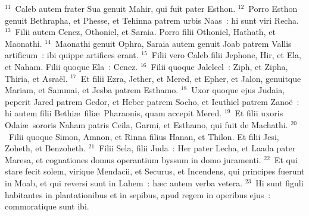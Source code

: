 ${}^{11}$~Caleb autem frater Sua genuit Mahir, qui fuit pater Esthon.
${}^{12}$~Porro Esthon genuit Bethrapha, et Phesse, et Tehinna patrem urbis Naas~: hi sunt viri Recha.
${}^{13}$~Filii autem Cenez, Othoniel, et Saraia. Porro filii Othoniel, Hathath, et Maonathi.
${}^{14}$~Maonathi genuit Ophra, Saraia autem genuit Joab patrem Vallis artificum~: ibi quippe artifices erant.
${}^{15}$~Filii vero Caleb filii Jephone, Hir, et Ela, et Naham. Filii quoque Ela~: Cenez.
${}^{16}$~Filii quoque Jaleleel~: Ziph, et Zipha, Thiria, et Asra\"el.
${}^{17}$~Et filii Ezra, Jether, et Mered, et Epher, et Jalon, genuitque Mariam, et Sammai, et Jesba patrem Esthamo.
${}^{18}$~Uxor quoque ejus Judaia, peperit Jared patrem Gedor, et Heber patrem Socho, et Icuthiel patrem Zano\"e~: hi autem filii Bethi\ae\ fili\ae\ Pharaonis, quam accepit Mered.
${}^{19}$~Et filii uxoris Odai\ae\ sororis Naham patris Ceila, Garmi, et Esthamo, qui fuit de Machathi.
${}^{20}$~Filii quoque Simon, Amnon, et Rinna filius Hanan, et Thilon. Et filii Jesi, Zoheth, et Benzoheth.
${}^{21}$~Filii Sela, filii Juda~: Her pater Lecha, et Laada pater Maresa, et cognationes domus operantium byssum in domo juramenti.
${}^{22}$~Et qui stare fecit solem, virique Mendacii, et Securus, et Incendens, qui principes fuerunt in Moab, et qui reversi sunt in Lahem~: h\ae c autem verba vetera.
${}^{23}$~Hi sunt figuli habitantes in plantationibus et in sepibus, apud regem in operibus ejus~: commoratique sunt ibi.


